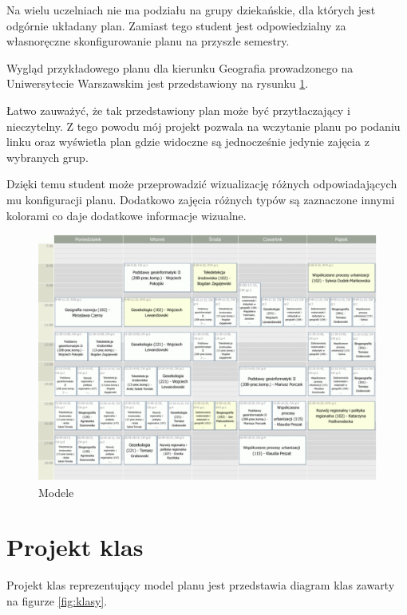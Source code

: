 \documentclass{mwart}
\begin{document}
Na wielu uczelniach nie ma podziału na grupy dziekańskie, dla których jest odgórnie układany plan. Zamiast tego student jest odpowiedzialny za własnoręczne skonfigurowanie planu na przyszłe semestry. 

Wygląd przykładowego planu dla kierunku Geografia prowadzonego na Uniwersytecie Warszawskim jest przedstawiony na rysunku \ref{fig:przykladowyPlan}.

Łatwo zauważyć, że tak przedstawiony plan może być przytłaczający i nieczytelny. Z tego powodu mój projekt pozwala na wczytanie planu po podaniu linku oraz wyświetla plan gdzie widoczne są jednocześnie jedynie zajęcia z wybranych grup.

Dzięki temu student może przeprowadzić wizualizację różnych odpowiadających mu konfiguracji planu. Dodatkowo zajęcia różnych typów są zaznaczone innymi kolorami co daje dodatkowe informacje wizualne.

\begin{figure}[h]
    \centering
    \includegraphics[width=13cm]{Example_plan}
    \caption{Modele}
    \label{fig:przykladowyPlan}
\end{figure}


\newpage{}
\section{Projekt klas}
Projekt klas reprezentujący model planu jest przedstawia diagram klas zawarty na figurze \ref{fig:klasy}.
\end{document}
